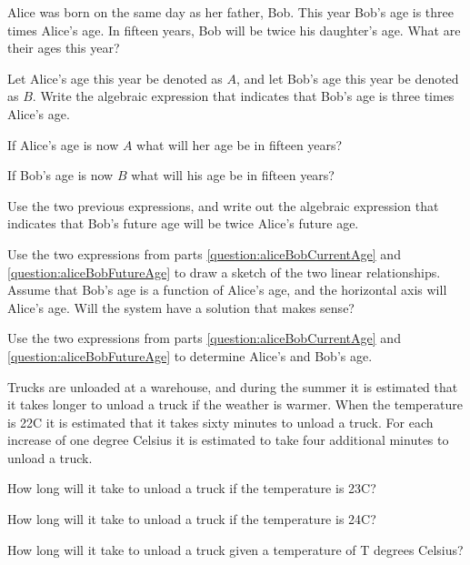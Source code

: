 \begin{problem}
\item Alice was born on the same day as her father, Bob. This year
  Bob's age is three times Alice's age. In fifteen years, Bob will be
  twice his daughter's age. What are their ages this year?
  \begin{subproblem}
  \item Let Alice's age this year be denoted as $A$, and let Bob's age
    this year be denoted as $B$. Write the algebraic expression that
    indicates that Bob's age is three times Alice's age.  
    \label{question:aliceBobCurrentAge}
    \vspace{2em}
  \item If Alice's age is now $A$ what will her age be in fifteen
    years?  
    \vspace{2em}
  \item If Bob's age is now $B$ what will his age be in fifteen years?
    \vspace{2em}
  \item Use the two previous expressions, and write out the algebraic
    expression that indicates that Bob's future age will be twice
    Alice's future age.
    \label{question:aliceBobFutureAge}
    \vspace{2em}
  \item Use the two expressions from parts
    \ref{question:aliceBobCurrentAge} and \ref{question:aliceBobFutureAge} 
    to draw a sketch of the two linear relationships. Assume that
    Bob's age is a function of Alice's age, and the horizontal axis
    will Alice's age. Will the system have a solution that makes
    sense? 
    \vfill

  \item Use the two expressions from parts
    \ref{question:aliceBobCurrentAge} and \ref{question:aliceBobFutureAge} 
    to determine Alice's and Bob's age.
    \vfill
  \end{subproblem}

\clearpage

\item Trucks are unloaded at a warehouse, and during the summer it is
  estimated that it takes longer to unload a truck if the weather is
  warmer. When the temperature is 22C it is estimated that it takes
  sixty minutes to unload a truck. For each increase of one degree
  Celsius it is estimated to take four additional minutes to unload a
  truck.
  \begin{subproblem}
    \item How long will it take to unload a truck if the temperature
      is 23C?
      \vspace{2em}
    \item How long will it take to unload a truck if the temperature
      is 24C?
      \vspace{2em}
    \item How long will it take to unload a truck given a temperature
      of T degrees Celsius?
      \vfill
  \end{subproblem}


\end{problem}
